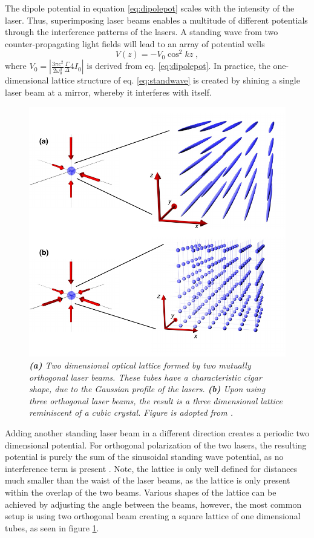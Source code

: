 The dipole potential in equation \eqref{eq:dipolepot} scales with the intensity of the laser. Thus, superimposing laser beams enables a multitude of different potentials through the interference patterns of the lasers. A standing wave from two counter-propagating light fields will lead to an array of potential wells
\begin{equation}
	V(z) = - V_0 \cos^2{k z } \; ,
	\label{eq:standwave}
\end{equation}
where $V_0 = | \frac{3 \pi c^2}{2 \omega_{0}^3} \frac{\Gamma}{\Delta} 4 I_0 |$ is derived from eq. \eqref{eq:dipolepot}. In practice, the one-dimensional lattice structure of eq. \eqref{eq:standwave} is created by shining a single laser beam at a mirror, whereby it interferes with itself.
\begin{figure}[!h]
	\centering
	\includegraphics[width=0.7\columnwidth]{Figures/OpticalLattice.pdf} 
	\caption{\textit{\textbf{(a)} Two dimensional optical lattice formed by two mutually orthogonal laser beams. These tubes have a characteristic cigar shape, due to the Gaussian profile of the lasers. \textbf{(b)} Upon using three orthogonal laser beams, the result is a three dimensional lattice reminiscent of a cubic crystal. Figure is adopted from \cite{WideraThesis}.}}
	\label{fig:OpticalLattice} 
\end{figure}
Adding another standing laser beam in a different direction creates a periodic two dimensional potential. For orthogonal polarization of the two lasers, the resulting potential is purely the sum of the sinusoidal standing wave potential, as no interference term is present \cite{lewenstein}. Note, the lattice is only well defined for distances much smaller than the waist of the laser beams, as the lattice is only present within the overlap of the two beams. Various shapes of the lattice can be achieved by adjusting the angle between the beams, however, the most common setup is using two orthogonal beam creating a square lattice of one dimensional tubes, as seen in figure \ref{fig:OpticalLattice}.

